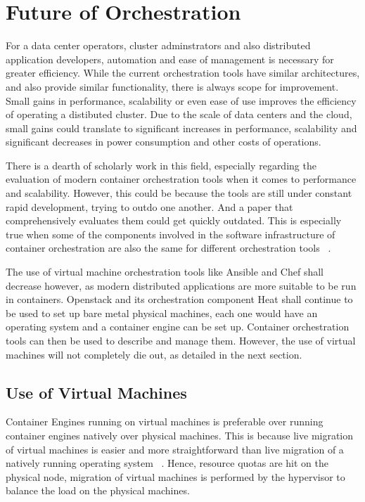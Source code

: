 \documentclass[10pt,twocolumn]{article}
\begin{document}
\section{Future of Orchestration}

For a data center operators, cluster adminstrators and also distributed application developers, automation and ease of management is necessary for greater efficiency.
While the current orchestration tools have similar architectures, and also provide similar functionality, there is always scope for improvement.
Small gains in performance, scalability or even ease of use improves the efficiency of operating a distibuted cluster.
Due to the scale of data centers and the cloud, small gains could translate to significant increases in performance, scalability and significant decreases in power consumption and other costs of operations.

There is a dearth of scholarly work in this field, especially regarding the evaluation of modern container orchestration tools when it comes to performance and scalability.
However, this could be because the tools are still under constant rapid development, trying to outdo one another.
And a paper that comprehensively evaluates them could get quickly outdated.
This is especially true when some of the components involved in the software infrastructure of container orchestration are also the same for different orchestration tools ~\cite{intro_docker}.

The use of virtual machine orchestration tools like Ansible and Chef shall decrease however, as modern distributed applications are more suitable to be run in containers.
Openstack and its orchestration component Heat shall continue to be used to set up bare metal physical machines, each one would have an operating system and a container engine can be set up.
Container orchestration tools can then be used to describe and manage them.
However, the use of virtual machines will not completely die out, as detailed in the next section.

\subsection{Use of Virtual Machines}

Container Engines running on virtual machines is preferable over running container engines natively over physical machines.
This is because live migration of virtual machines is easier and more straightforward than live migration of a natively running operating system ~\cite{live_migration}.
Hence, resource quotas are hit on the physical node, migration of virtual machines is performed by the hypervisor to balance the load on the physical machines.
\end{document}
